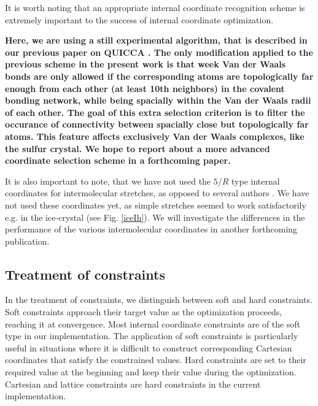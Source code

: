 \twolinestyle{\documentclass[prb,preprint]{revtex4}}
\begin{document}
It is worth noting that an appropriate internal coordinate 
recognition scheme is extremely important to the success of internal 
coordinate optimization.  
{\bf Here, we are using a still experimental algorithm, that is described
in our previous paper on QUICCA \cite{KNemeth04}. The only modification
applied to the previous scheme in the present work is that
week Van der Waals bonds are only allowed if the corresponding atoms
are topologically far enough from each other 
(at least 10th neighbors) in the covalent bonding
network, while being spacially within the Van der Waals radii of 
each other. 
The goal
of this extra selection criterion is to filter the occurance of
connectivity between spacially close but topologically far atoms.
This feature affects 
exclusively Van der Waals complexes, like the sulfur crystal. 
We hope to report about a more advanced coordinate selection scheme in
a forthcoming paper.

It is also important to note, that we have not used the $5/R$ type
internal coordinates for intermolecular stretches, as opposed to 
several authors \cite{JBaker00,TBucko05}. We have not used 
these coordinates yet, as simple stretches seemed to work satisfactorily
e.g. in the ice-crystal (see Fig. \ref{iceIh}). We will
investigate the differences in the performance of the various 
intermolecular coordinates in another forthcoming publication.
}

\subsection{Treatment of constraints}

In the treatment of  constraints, we distinguish between soft and hard constraints.
Soft constraints approach their target value as the optimization proceeds,  reaching it at 
convergence.  Most internal coordinate constraints are of the soft type in our implementation. 
The application of soft constraints is particularly useful in situations where it is difficult
to construct corresponding Cartesian coordinates that satisfy the constrained values.
Hard constraints are set to their required value  at the beginning and keep their value during 
the optimization.  Cartesian  and lattice constraints are hard constraints in the current 
implementation. 
\end{document}
